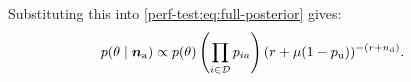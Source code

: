 \documentclass[thesis.tex]{subfiles}
\begin{document}
Substituting this into \cref{perf-test:eq:full-posterior} gives:
\begin{align}
p(\theta \mid \bm{n_\text{a}})
&\propto p(\theta) \left( \prod_{i \in \mathcal{D}} p_{ia} \right) (r + \mu (1- p_\text{u}))^{-(r+n_\text{d})} \label{perf-test:eq:full-posterior-simplified}.
\end{align}

\end{document}
